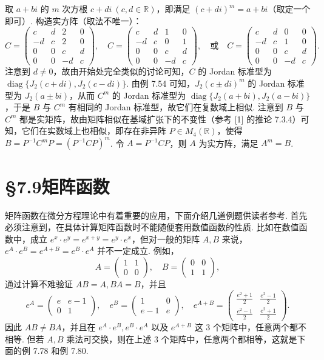 \documentclass[UTF8,12pt,a4paper,fontset=fandol]{ctexart}
\begin{document}
取 $a+bi$ 的 $m$ 次方根 $c+di\ (c,d\in\mathbb{R})$，即满足 $(c+di)^m=a+bi$（取定一个即可）. 构造实方阵（取法不唯一）：
\[
C=\left(\begin{array}{rrrr}
c&d&2&0\\
-d&c&2&0\\
0&0&c&d\\
0&0&-d&c
\end{array}\right),
\quad
C=\left(\begin{array}{rrrr}
c&d&1&0\\
-d&c&0&1\\
0&0&c&d\\
0&0&-d&c
\end{array}\right),
\quad \text{或}\quad
C=\left(\begin{array}{rrrr}
c&d&0&0\\
-d&c&1&0\\
0&0&c&d\\
0&0&-d&c
\end{array}\right).
\]
注意到 $d\ne0$，故由开始处完全类似的讨论可知，$C$ 的 Jordan 标准型为 $\operatorname{diag}\{J_2(c+di),J_2(c-di)\}$. 由例 7.54 可知，$J_2(c\pm di)^m$ 的 Jordan 标准型为 $J_2(a\pm bi)$，从而 $C^m$ 的 Jordan 标准型为 $\operatorname{diag}\{J_2(a+bi),J_2(a-bi)\}$，于是 $B$ 与 $C^m$ 有相同的 Jordan 标准型，故它们在复数域上相似. 注意到 $B$ 与 $C^m$ 都是实矩阵，故由矩阵相似在基域扩张下的不变性（参考 [1] 的推论 7.3.4）可知，它们在实数域上也相似，即存在非异阵 $P\in M_4(\mathbb{R})$，使得 $B=P^{-1}C^mP=(P^{-1}CP)^m$. 令 $A=P^{-1}CP$，则 $A$ 为实方阵，满足 $A^m=B$.

\section*{§7.9\quad 矩阵函数}

矩阵函数在微分方程理论中有着重要的应用，下面介绍几道例题供读者参考. 首先必须注意到，在具体计算矩阵函数时不能随便套用数值函数的性质. 比如在数值函数中，成立 $e^x\cdot e^y=e^{x+y}=e^y\cdot e^x$，但对一般的矩阵 $A,B$ 来说，$e^A\cdot e^B=e^{A+B}=e^B\cdot e^A$ 并不一定成立. 例如，
\[
A=\left(\begin{array}{cc}1&1\\0&0\end{array}\right),\quad
B=\left(\begin{array}{cc}0&0\\1&1\end{array}\right),
\]
通过计算不难验证 $AB=A,BA=B$，并且
\[
e^A=\left(\begin{array}{cc}e&e-1\\0&1\end{array}\right),\quad
e^B=\left(\begin{array}{cc}1&0\\e-1&e\end{array}\right),\quad
e^{A+B}=\left(\begin{array}{cc}\frac{e^2+1}{2}&\frac{e^2-1}{2}\\[2pt]\frac{e^2-1}{2}&\frac{e^2+1}{2}\end{array}\right).
\]
因此 $AB\ne BA$，并且在 $e^A\cdot e^B,e^B\cdot e^A$ 以及 $e^{A+B}$ 这 3 个矩阵中，任意两个都不相等. 但若 $A,B$ 乘法可交换，则在上述 3 个矩阵中，任意两个都相等，这就是下面的例 7.78 和例 7.80.
\end{document}
